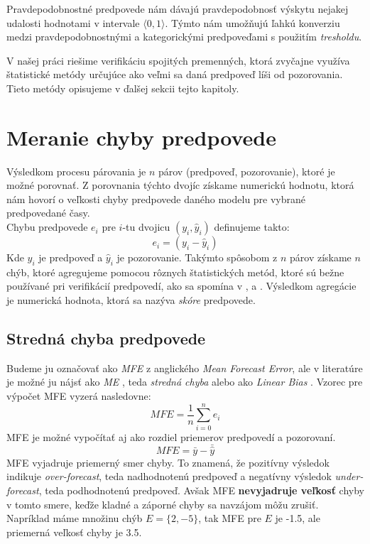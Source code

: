 Pravdepodobnostné predpovede nám dávajú pravdepodobnosť výskytu nejakej udalosti hodnotami v intervale $ \langle0, 1\rangle $. Týmto nám umožňujú ľahkú konverziu medzi pravdepodobnostnými a kategorickými predpoveďami s použitím \textit{tresholdu}.

V našej práci riešime verifikáciu spojitých premenných, ktorá zvyčajne využíva štatistické metódy určujúce ako veľmi sa daná predpoveď líši od pozorovania. Tieto metódy opisujeme v ďalšej sekcii tejto kapitoly.

\pagebreak

\section{Meranie chyby predpovede}
\label{sec:errormeasurement}
Výsledkom procesu párovania je $n$ párov (predpoveď, pozorovanie), ktoré je možné porovnať. Z porovnania týchto dvojíc získame numerickú hodnotu, ktorá nám hovorí o veľkosti chyby predpovede daného modelu pre vybrané predpovedané časy.
\\
Chybu predpovede $e_i$ pre $i$-tu dvojicu $(y_i, \hat{y}_i)$ definujeme takto: 
\[  
	e_i = (y_i - \hat{y}_i)
\]
Kde $ y_i $ je predpoveď a $ \hat{y}_i $ je pozorovanie.
Takýmto spôsobom z $ n $ párov získame $ n $ chýb, ktoré agregujeme pomocou rôznych štatistických metód, ktoré sú bežne používané pri verifikácií predpovedí, ako sa spomína v \cite{RecommendOnVerif}, \cite{IntroToVerif} a \cite{ContinuousVerif}. Výsledkom agregácie je numerická hodnota, ktorá sa nazýva \textit{skóre} predpovede. 

\subsection{Stredná chyba predpovede}
Budeme ju označovať ako \textit{MFE} z anglického \textit{Mean Forecast Error}, ale v literatúre je možné ju nájsť ako \textit{ME} \cite{RecommendOnVerif}, teda \textit{stredná chyba} alebo ako \textit{Linear Bias} \cite{ContinuousVerif, IntroToVerif}. Vzorec pre výpočet MFE vyzerá nasledovne:
\[
	MFE = \frac{1}{n}\sum\limits_{i=0}^{n}  e_i  
\]
MFE je možné vypočítať aj ako rozdiel priemerov predpovedí a pozorovaní.
\[
	MFE = \bar{y} - \bar{\hat{y}}  
\]
MFE vyjadruje priemerný smer chyby. To znamená, že pozitívny výsledok indikuje \textit{over-forecast}, teda nadhodnotenú predpoveď a negatívny výsledok \textit{under-forecast}, teda podhodnotenú predpoveď. Avšak MFE \textbf{nevyjadruje veľkosť} chyby v tomto smere, keďže kladné a záporné chyby sa navzájom môžu zrušiť. 
Napríklad máme množinu chýb $ E = \{2, -5\} $, tak MFE pre $ E $ je -1.5, ale priemerná veľkosť chyby je 3.5.  

